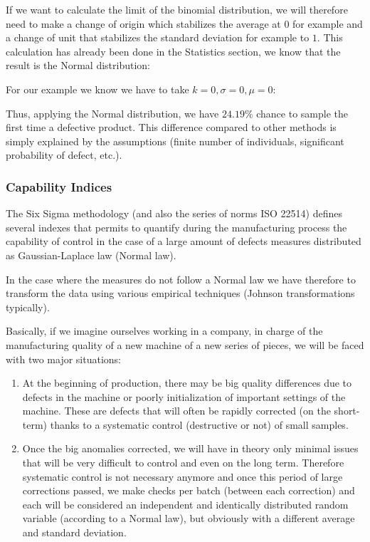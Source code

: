 If we want to calculate the limit of the binomial distribution, we will therefore need to make a change of origin which stabilizes the average at $0$ for example and a change of unit that stabilizes the standard deviation for example to $1$. This calculation has already been done in the Statistics section, we know that the result is the Normal distribution:
	
For our example we know we have to take $k=0,\sigma=0,\mu=0$:
	
Thus, applying the Normal distribution, we have $24.19\%$ chance to sample the first time a defective product. This difference compared to other methods is simply explained by the assumptions (finite number of individuals, significant probability of defect, etc.).

	\subsubsection{Capability Indices}

The Six Sigma methodology (and also the series of norms ISO 22514) defines several indexes that permits to quantify during the manufacturing process the capability of control in the case of a large amount of defects measures distributed as Gaussian-Laplace law (Normal law).

In the case where the measures do not follow a Normal law we have therefore to transform the data using various empirical techniques (Johnson transformations typically).

Basically, if we imagine ourselves working in a company, in charge of the manufacturing quality of a new machine of a new series of pieces, we will be faced with two major situations:
	\begin{enumerate}
		\item At the beginning of production, there may be big quality differences due to defects in the machine or poorly initialization of important settings of the machine. These are defects that will often be rapidly corrected (on the short-term) thanks to a systematic control (destructive or not) of small samples. 
		
		\item Once the big anomalies corrected, we will have in theory only minimal issues that will be very difficult to control and even on the long term. Therefore systematic control is not necessary anymore and once this period of large corrections passed, we make checks per batch (between each correction) and each will be considered an independent and identically distributed random variable (according to a Normal law), but obviously with a different average and standard deviation.
	\end{enumerate}

